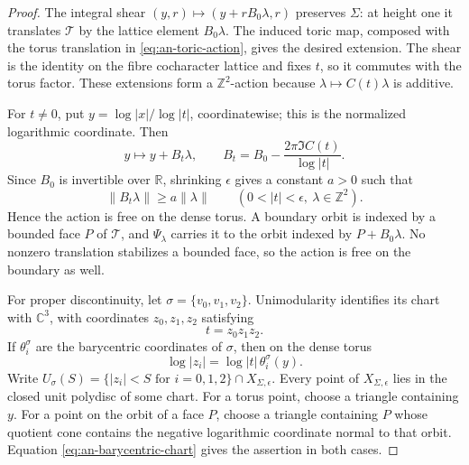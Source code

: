 \documentclass[10pt,a4paper]{amsart}
\newcommand{\CC}{\mathbb C}
\newcommand{\ZZ}{\mathbb Z}
\begin{document}
\begin{proof}
The integral shear $(y,r)\mapsto(y+rB_0\lambda,r)$
preserves $\Sigma$: at height one it translates $\mathcal T$ by the
lattice element $B_0\lambda$.  The induced toric map, composed with the
torus translation in \eqref{eq:an-toric-action}, gives the desired
extension.  The shear is the identity on the fibre cocharacter lattice and
fixes $t$, so it commutes with the torus factor.  These extensions form a
$\ZZ^2$-action because $\lambda\mapsto C(t)\lambda$ is additive.

For $t\ne0$, put $y=\log|x|/\log|t|$, coordinatewise; this is the
normalized logarithmic coordinate.  Then
\begin{equation}\label{eq:an-log-coordinate-translation}
 y\longmapsto y+B_t\lambda,
 \qquad
 B_t=B_0-\frac{2\pi\Im C(t)}{\log|t|}.
\end{equation}
Since $B_0$ is invertible over $\mathbb R$, shrinking $\epsilon$
gives a constant $a>0$ such that
\begin{equation}\label{eq:an-singular-value-bound}
 \|B_t\lambda\|\geq a\|\lambda\|
 \qquad(0<|t|<\epsilon,\ \lambda\in\ZZ^2).
\end{equation}
Hence the action is free on the dense torus.  A boundary
orbit is indexed by a bounded face $P$ of $\mathcal T$, and
$\Psi_\lambda$ carries it to the orbit indexed by
$P+B_0\lambda$.  No nonzero translation stabilizes a bounded face, so
the action is free on the boundary as well.

For proper discontinuity, let
$\sigma=\{v_0,v_1,v_2\}$.  Unimodularity identifies its chart with
$\CC^3$, with coordinates $z_0,z_1,z_2$ satisfying
\begin{equation}\label{eq:an-local-t-equation}
 t=z_0z_1z_2.
\end{equation}
If $\theta_i^\sigma$ are the barycentric coordinates of $\sigma$, then
on the dense torus
\begin{equation}\label{eq:an-barycentric-chart}
 \log|z_i|=\log|t|\,\theta_i^\sigma(y).
\end{equation}
Write
$U_\sigma(S)=\{|z_i|<S\text{ for }i=0,1,2\}
\cap X_{\Sigma,\epsilon}$.
Every point of $X_{\Sigma,\epsilon}$ lies in the closed unit polydisc of
some chart.  For a torus point, choose a triangle containing $y$.  For a
point on the orbit of a face $P$, choose a triangle containing $P$ whose
quotient cone contains the negative logarithmic coordinate normal to that
orbit.  Equation \eqref{eq:an-barycentric-chart} gives the assertion in
both cases.


\end{proof}
\end{document}
